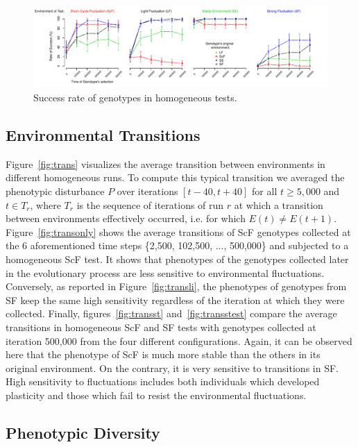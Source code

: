 \begin{figure}[t]
\centering
\includegraphics[width=2\columnwidth]{img/testSurvivingRates}
\caption{Success rate of genotypes in homogeneous tests.}
\label{fig:survrate}
\end{figure}

\subsection{Environmental Transitions}

Figure~\ref{fig:trans} visualizes the average transition between environments in different homogeneous runs. To compute this typical transition we averaged the phenotypic disturbance $P$ over iterations $[t-40, t+40]$ for all $t \ge 5,000$ and $t \in T_r$, where $T_r$ is the sequence of iterations of run $r$ at which a transition between environments effectively occurred, i.e. for which $E(t) \ne E(t+1)$. Figure~\ref{fig:transonly} shows the average transitions of ScF genotypes collected at the 6 aforementioned time steps \{2,500, 102,500, ..., 500,000\} and subjected to a homogeneous ScF test. It shows that phenotypes of the genotypes collected later in the evolutionary process are less sensitive to environmental fluctuations. Conversely, as reported in Figure~\ref{fig:transli}, the phenotypes of genotypes from SF keep the same high sensitivity regardless of the iteration at which they were collected. Finally, figures~\ref{fig:transst} and~\ref{fig:transstest} compare the average transitions in homogeneous ScF and SF tests with genotypes collected at iteration 500,000 from the four different configurations. Again, it can be observed here that the phenotype of ScF is much more stable than the others in its original environment. On the contrary, it is very sensitive to transitions in SF. High sensitivity to fluctuations includes both individuals which developed plasticity and those which fail to resist the environmental fluctuations.

\subsection{Phenotypic Diversity} 

